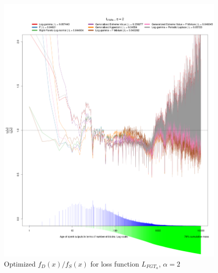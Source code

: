 \documentclass[english]{article}
\begin{document}
\begin{figure}
\caption{Optimized $f_{D}(x)/f_{S}(x)$ for loss function $L_{FGT_{\alpha}}$,
$\alpha=2$}

\includegraphics[scale=0.35]{images/dry-run/estimate-div-target/estimate-div-target-L_FGT-flavor-2}
\end{figure}
\end{document}
